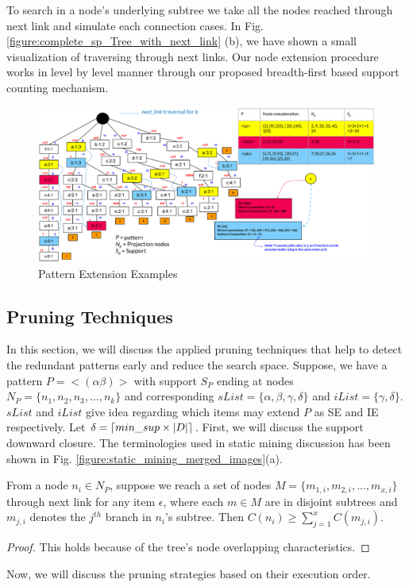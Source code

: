 To search in a node's underlying subtree we take all the nodes reached through next link and simulate each connection cases. In Fig. \ref{figure:complete_sp_Tree_with_next_link} (b), we have shown a small visualization of traversing through next links. Our node extension procedure works in level by level manner through our proposed breadth-first based support counting mechanism.

\begin{figure}[!tb]
\centering
\includegraphics[width=\textwidth]{pattern_extension_example}
\caption{Pattern Extension Examples} \label{figure:pattern_extension_example}
\hfil
\end{figure}


\subsection{Pruning Techniques}
In this section, we will discuss the applied pruning techniques that help to detect the redundant patterns early and reduce the search space. Suppose, we have a pattern $P=< (\alpha\beta) >$ with support $S_{P}$ ending at nodes $N_{P}=\{n_{1},n_{2},n_{3},...,n_{k}\}$ and corresponding $sList=\{\alpha,\beta,\gamma,\delta\}$ and $iList=\{\gamma,\delta\}$. $sList$ and $iList$ give idea regarding which items may extend $P$ as SE and IE respectively. Let $\delta= \lceil min\_sup \times \vert D \vert\rceil$. First, we will discuss the support downward closure. The terminologies used in static mining discussion has been shown in Fig. \ref{figure:static_mining_merged_images}(a).

\begin{lem} \label{lem:support_constraint}
    From a node $n_{i} \in N_{P}$, suppose we reach a set of nodes $M=\{m_{1,i},m_{2,i},...,m_{x,i}\}$ through next link for any item $\epsilon$, where each $m \in M$ are in disjoint subtrees and $m_{j,i}$ denotes the $j^{th}$ branch in $n_{i}$'s subtree. Then $C(n_{i}) \geq  \sum_{j=1}^{x} C(m_{j,i})$.
\end{lem}
\begin{proof}
    This holds because of the tree's node overlapping characteristics.
\end{proof}
Now, we will discuss the pruning strategies based on their execution order.
